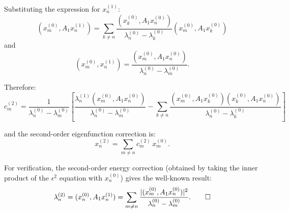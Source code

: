 \documentclass[12pt]{article}
\begin{document}
Substituting the expression for $x_n^{(1)}$:
\[
(x_m^{(0)}, A_1 x_n^{(1)}) = \sum_{k \neq n} \frac{(x_k^{(0)}, A_1 x_n^{(0)})}{\lambda_n^{(0)} - \lambda_k^{(0)}} (x_m^{(0)}, A_1 x_k^{(0)})
\]
and
\[
(x_m^{(0)}, x_n^{(1)}) = \frac{(x_m^{(0)}, A_1 x_n^{(0)})}{\lambda_n^{(0)} - \lambda_m^{(0)}}.
\]

Therefore:
\[
\boxed{c_m^{(2)} = \frac{1}{\lambda_n^{(0)} - \lambda_m^{(0)}}\left[\frac{\lambda_n^{(1)}(x_m^{(0)}, A_1 x_n^{(0)})}{\lambda_n^{(0)} - \lambda_m^{(0)}} - \sum_{k \neq n} \frac{(x_m^{(0)}, A_1 x_k^{(0)})(x_k^{(0)}, A_1 x_n^{(0)})}{\lambda_n^{(0)} - \lambda_k^{(0)}}\right]}
\]

and the second-order eigenfunction correction is:
\[
x_n^{(2)} = \sum_{m \neq n} c_m^{(2)}\, x_m^{(0)}.
\]

For verification, the second-order energy correction (obtained by taking the inner product of the $\epsilon^2$ equation with $x_n^{(0)}$) gives the well-known result:
\[
\lambda_n^{(2)} = (x_n^{(0)}, A_1 x_n^{(1)}) = \sum_{m \neq n} \frac{|(x_m^{(0)}, A_1 x_n^{(0)})|^2}{\lambda_n^{(0)} - \lambda_m^{(0)}}. \qed
\]
\end{document}
